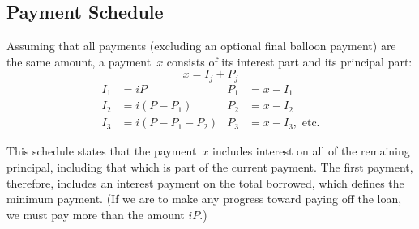 
\subsection{Payment Schedule}
Assuming that all payments (excluding an optional final balloon payment)
are the same amount, a payment~$x$ consists of its interest part and
its principal part:
\begin{equation}
\label{amort:components}
x=I_j + P_j
\end{equation}
\begin{align*}
I_1 &= iP               & P_1 &= x - I_1 \\
I_2 &= i(P - P_1)       & P_2 &= x - I_2 \\
I_3 &= i(P - P_1 - P_2) & P_3 &= x - I_3,\mbox{ etc.}
\end{align*}

This schedule states that the payment~$x$ includes interest on all
of the remaining principal, including that which is part of the
current payment.  The first payment, therefore, includes
an interest payment on the total borrowed, which defines the minimum
payment.  (If we are to make any progress toward paying off the loan,
we must pay more than the amount $iP$.)


